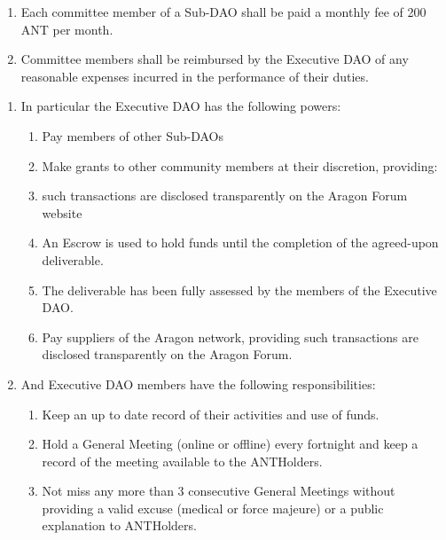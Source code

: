 \begin{enumerate}
\begin{enumerate}
		\begin{enumerate}
			\item Each committee member of a Sub-\ac{DAO} shall be paid a monthly fee of 200 ANT per month.
			\item Committee members shall be reimbursed by the Executive \ac{DAO} of any reasonable expenses incurred in the performance of their duties.
		\end{enumerate}
	
	\end{enumerate}
	
	\begin{enumerate}
		
		\begin{enumerate}
			
			\item In particular the Executive \ac{DAO} has the following powers:
			\begin{enumerate}
				\item Pay members of other Sub-\ac{DAO}s
				\item Make grants to other community members at their discretion, providing:
				\item such transactions are disclosed transparently on the Aragon Forum website
				\item An Escrow is used to hold funds until the completion of the agreed-upon deliverable.
				\item The deliverable has been fully assessed by the members of the Executive \ac{DAO}.
				\item Pay suppliers of the Aragon network, providing such transactions are disclosed transparently on the Aragon Forum.
			\end{enumerate}
			
			\item And Executive \ac{DAO} members have the following responsibilities:
			\begin{enumerate}
				\item Keep an up to date record of their activities and use of funds.
				\item Hold a General Meeting (online or offline) every fortnight and keep a record of the meeting available to the \glspl{ANTHolder}.
				\item Not miss any more than 3 consecutive General Meetings without providing a valid excuse (medical or force majeure) or a public explanation to \glspl{ANTHolder}.
			\end{enumerate}


\end{enumerate}
\end{enumerate}
\end{enumerate}
